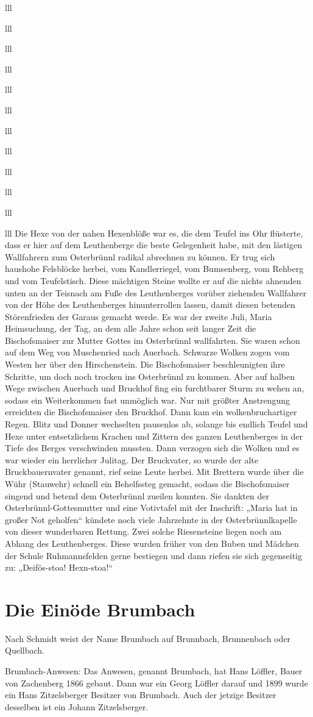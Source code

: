 \documentclass[12pt,a4pager]{book}
\begin{document}
\begin{tabuluar}{lll}
\begin{tabuluar}{lll}
\begin{tabuluar}{lll}
\begin{tabuluar}{lll}
\begin{tabuluar}{lll}
\begin{tabuluar}{lll}
\begin{tabuluar}{lll}
\begin{tabuluar}{lll}
\begin{tabuluar}{lll}
\begin{tabuluar}{lll}
\begin{tabuluar}{lll}
\begin{tabuluar}{lll}
Die Hexe von der nahen Hexenblöße war es, die dem Teufel ins Ohr flüsterte, dass
er hier auf dem Leuthenberge die beste Gelegenheit habe, mit den lästigen
Wallfahrern zum Osterbrünnl radikal abrechnen zu können. Er trug sich haushohe
Felsblöcke herbei, vom Kandlerriegel, vom Bumsenberg, vom Rehberg und vom
Teufelstisch. Diese mächtigen Steine wollte er auf die nichts ahnenden unten an
der Teisnach am Fuße des Leuthenberges vorüber ziehenden Wallfahrer von der Höhe
des Leuthenberges hinunterrollen lassen, damit diesen betenden Störenfrieden der
Garaus gemacht werde. Es war der zweite Juli, Maria Heimsuchung, der Tag, an dem
alle Jahre schon seit langer Zeit die Bischofsmaiser zur Mutter Gottes im
Osterbrünnl wallfahrten. Sie waren schon auf dem Weg von Muschenried nach
Auerbach. Schwarze Wolken zogen vom Westen her über den Hirschenstein. Die
Bischofsmaiser beschleunigten ihre Schritte, um doch noch trocken ins
Osterbrünnl zu kommen. Aber auf halben Wege zwischen Auerbach und Bruckhof fing
ein furchtbarer Sturm zu wehen an, sodass ein Weiterkommen fast unmöglich war.
Nur mit größter Anstrengung erreichten die Bischofsmaiser den Bruckhof. Dann kam
ein wolkenbruchartiger Regen. Blitz und Donner wechselten pausenlos ab, solange
bis endlich Teufel und Hexe unter entsetzlichem Krachen und Zittern des ganzen
Leuthenberges in der Tiefe des Berges verschwinden mussten. Dann verzogen sich
die Wolken und es war wieder ein herrlicher Julitag. Der Bruckvater, so wurde
der alte Bruckbauernvater genannt, rief seine Leute herbei. Mit Brettern wurde
über die Wühr (Stauwehr) schnell ein Behelfssteg gemacht, sodass die
Bischofsmaiser singend und betend dem Osterbrünnl zueilen konnten. Sie dankten
der Osterbrünnl-Gottesmutter und eine Votivtafel mit der Inschrift: „Maria hat
in großer Not geholfen“ kündete noch viele Jahrzehnte in der Osterbrünnlkapelle
von dieser wunderbaren Rettung. Zwei solche Riesensteine liegen noch am Abhang
des Leuthenberges. Diese wurden früher von den Buben und Mädchen der Schule
Ruhmannsfelden gerne bestiegen und dann riefen sie sich gegenseitig zu:
„Deifös-stoa! Hexn-stoa!“

\section{Die Einöde Brumbach}

Nach Schmidt weist der Name Brumbach auf Brunnbach, Brunnenbach oder Quellbach.

Brumbach-Anwesen: Das Anwesen, genannt Brumbach, hat Hans Löffler, Bauer von
Zachenberg 1866 gebaut. Dann war ein Georg Löffler darauf und 1899 wurde ein
Hans Zitzelsberger Besitzer von Brumbach. Auch der jetzige Besitzer desselben
ist ein Johann Zitzelsberger.


\end{tabuluar}
\end{tabuluar}
\end{tabuluar}
\end{tabuluar}
\end{tabuluar}
\end{tabuluar}
\end{tabuluar}
\end{tabuluar}
\end{tabuluar}
\end{tabuluar}
\end{tabuluar}
\end{tabuluar}
\end{document}
